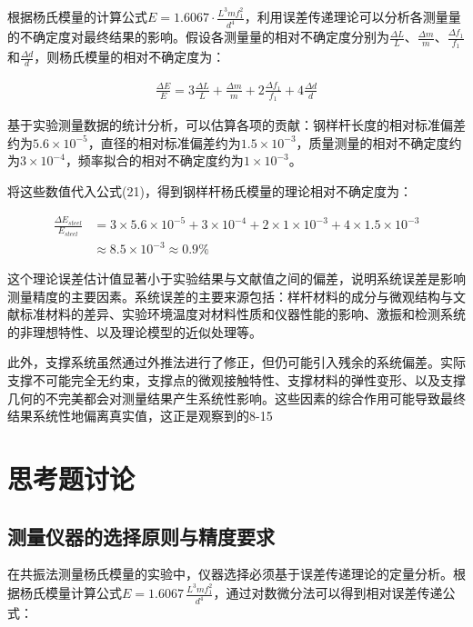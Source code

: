 ﻿\documentclass[12pt,a4paper]{article}
\begin{document}
根据杨氏模量的计算公式$E = 1.6067 \cdot \frac{L^3 m f_1^2}{d^4}$，利用误差传递理论可以分析各测量量的不确定度对最终结果的影响。假设各测量量的相对不确定度分别为$\frac{\Delta L}{L}$、$\frac{\Delta m}{m}$、$\frac{\Delta f_1}{f_1}$和$\frac{\Delta d}{d}$，则杨氏模量的相对不确定度为：

\begin{align}
\frac{\Delta E}{E} = 3\frac{\Delta L}{L} + \frac{\Delta m}{m} + 2\frac{\Delta f_1}{f_1} + 4\frac{\Delta d}{d} \tag{21}
\end{align}

基于实验测量数据的统计分析，可以估算各项的贡献：钢样杆长度的相对标准偏差约为$5.6 \times 10^{-5}$，直径的相对标准偏差约为$1.5 \times 10^{-3}$，质量测量的相对不确定度约为$3 \times 10^{-4}$，频率拟合的相对不确定度约为$1 \times 10^{-3}$。

将这些数值代入公式(21)，得到钢样杆杨氏模量的理论相对不确定度为：

\begin{align}
\frac{\Delta E_{steel}}{E_{steel}} &= 3 \times 5.6 \times 10^{-5} + 3 \times 10^{-4} + 2 \times 1 \times 10^{-3} + 4 \times 1.5 \times 10^{-3} \tag{22}\\
&\approx 8.5 \times 10^{-3} \approx 0.9\% \tag{23}
\end{align}

这个理论误差估计值显著小于实验结果与文献值之间的偏差，说明系统误差是影响测量精度的主要因素。系统误差的主要来源包括：样杆材料的成分与微观结构与文献标准材料的差异、实验环境温度对材料性质和仪器性能的影响、激振和检测系统的非理想特性、以及理论模型的近似处理等。

此外，支撑系统虽然通过外推法进行了修正，但仍可能引入残余的系统偏差。实际支撑不可能完全无约束，支撑点的微观接触特性、支撑材料的弹性变形、以及支撑几何的不完美都会对测量结果产生系统性影响。这些因素的综合作用可能导致最终结果系统性地偏离真实值，这正是观察到的8-15%

\section{思考题讨论}

\subsection{测量仪器的选择原则与精度要求}

在共振法测量杨氏模量的实验中，仪器选择必须基于误差传递理论的定量分析。根据杨氏模量计算公式$E = 1.6067\,\frac{L^3 m f_1^2}{d^4}$，通过对数微分法可以得到相对误差传递公式：
\end{document}
